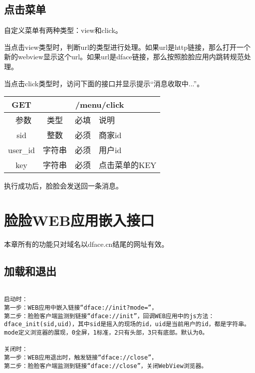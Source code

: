 \documentclass[cs4size]{ctexartutf8}
\begin{document}
\subsection{点击菜单}
自定义菜单有两种类型：view和click。

当点击view类型时，判断url的类型进行处理。如果url是http链接，那么打开一个新的webview显示这个url。如果url是dface链接，那么按照脸脸应用内跳转规范处理。

当点击click类型时，访问下面的接口并显示提示“消息收取中...”。

\begin{table}[H]
   \begin{center}
\begin{tabular}{|c|c|c|p{12cm}|}
\hline
GET & \multicolumn{3}{|c|}{/menu/click} \\
\hline\hline
 \  参数  & 类型 & 必填 &  说明  \\
   \hline
 sid  & 整数 & 必须 & 商家id\\ 
  \hline
 user\_id  & 字符串 & 必须 & 用户id\\ 
  \hline
 key  & 字符串 & 必须 & 点击菜单的KEY\\ 
  \hline
\end{tabular}
   \end{center}
\end{table}

执行成功后，脸脸会发送回一条消息。

\section{脸脸WEB应用嵌入接口}

本章所有的功能只对域名以dface.cn结尾的网址有效。

\subsection{加载和退出}

\begin{verbatim}

启动时：
第一步：WEB应用中嵌入链接“dface://init?mode=”，
第二步：脸脸客户端监测到链接“dface://init”，回调WEB应用中的js方法：dface_init(sid,uid)，其中sid是摇入的现场的id，uid是当前用户的id，都是字符串。mode定义浏览器的展现，0全屏，1标准，2只有头部，3只有底部。默认为0。

关闭时：
第一步：WEB应用退出时，触发链接“dface://close”，
第二步：脸脸客户端监测到链接“dface://close”，关闭WebView浏览器。
\end{verbatim}
\end{document}
